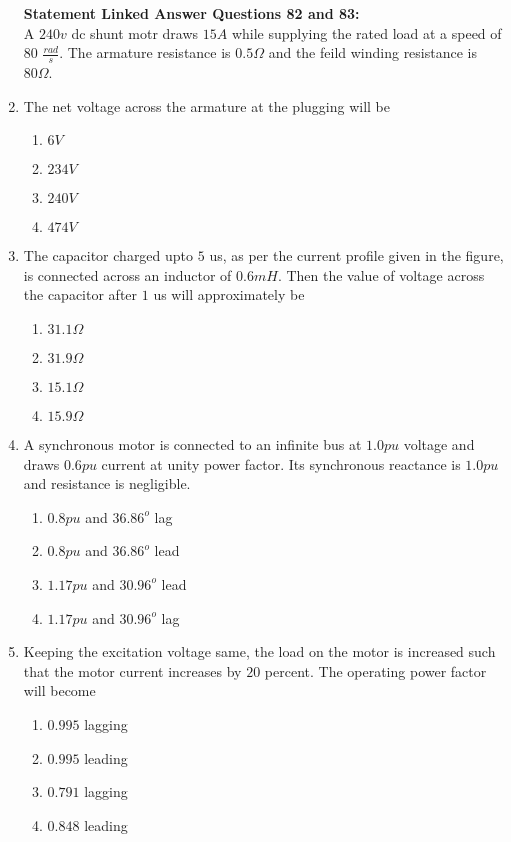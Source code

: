 \documentclass[journal]{IEEEtran}
\begin{document}
\begin{enumerate}
 \textbf{Statement Linked Answer Questions 82 and 83:}\\
A $240 v$ dc shunt motr draws $15 A$ while supplying the rated load at a speed of $80$ $\frac{rad}{s}$. The armature resistance is $0.5 \Omega$ and the feild winding resistance is $80 \Omega$.\\
\item The net voltage across the armature at the plugging will be 
\begin{enumerate}
    \item $6 V$ 
    \item $234 V$
    \item $240 V$
    \item $474 V$
\end{enumerate}
\item The capacitor charged upto $5$ us, as per the current profile given in the figure, is connected across an inductor of $0.6 mH$. Then the value of voltage across the capacitor after $1$ us will approximately be
\begin{enumerate}
    \item $31.1\Omega$
    \item $31.9\Omega$
    \item $15.1\Omega$
    \item $15.9\Omega$
\end{enumerate}
\item A synchronous motor is connected to an infinite bus at $1.0 pu$ voltage and draws $0.6 pu$ current at unity power factor. Its synchronous reactance is $1.0 pu$ and resistance is negligible.
\begin{enumerate}
    \item $0.8 pu$ and $36.86^o$ lag
    \item $0.8 pu$ and $36.86^o$ lead
    \item $1.17 pu$ and $30.96^o$ lead
    \item $1.17 pu$ and $30.96^o$ lag
\end{enumerate}
\item Keeping the excitation voltage same, the load on the motor is increased such that the motor current increases by $20$ percent. The operating power factor will become
\begin{enumerate}
    \item $0.995$ lagging 
    \item $0.995$ leading
    \item $0.791$ lagging
    \item $0.848$ leading
\end{enumerate}
 \end{enumerate}
\end{document}
